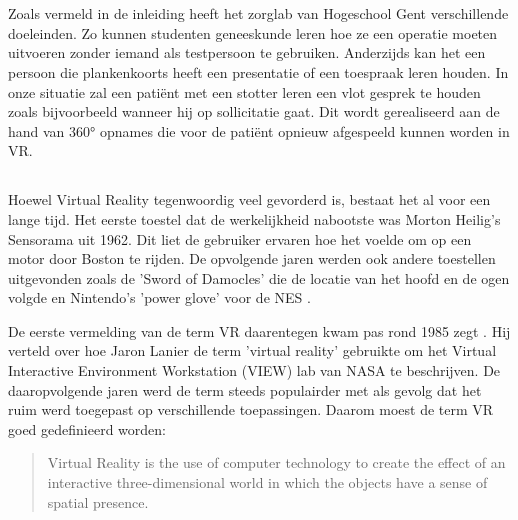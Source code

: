 \chapter{} \label{chap:State of the art}%
\label{ch:stand-van-zaken}



Zoals vermeld in de inleiding heeft het zorglab van Hogeschool Gent verschillende doeleinden. Zo kunnen studenten geneeskunde leren hoe ze een operatie moeten uitvoeren zonder iemand als testpersoon te gebruiken. Anderzijds kan het een persoon die plankenkoorts heeft een presentatie of een toespraak leren houden. In onze situatie zal een patiënt met een stotter leren een vlot gesprek te houden zoals bijvoorbeeld wanneer hij op sollicitatie gaat. Dit wordt gerealiseerd aan de hand van 360° opnames die voor de patiënt opnieuw afgespeeld kunnen worden in VR.

\section{}%
Hoewel Virtual Reality tegenwoordig veel gevorderd is, bestaat het al voor een lange tijd. Het eerste toestel dat de werkelijkheid nabootste was Morton Heilig’s Sensorama uit 1962. Dit liet de gebruiker ervaren hoe het voelde om op een motor door Boston te rijden. De opvolgende jaren werden ook andere toestellen uitgevonden zoals de 'Sword of Damocles' die de locatie van het hoofd en de ogen volgde en Nintendo's 'power glove' voor de NES \autocite{Boas2012}.

De eerste vermelding van de term VR daarentegen kwam pas rond 1985 zegt \textcite{Bryson2013}. Hij verteld over hoe Jaron Lanier de term 'virtual reality' gebruikte om het Virtual Interactive Environment Workstation (VIEW) lab van NASA te beschrijven. De daaropvolgende jaren werd de term steeds populairder met als gevolg dat het ruim werd toegepast op verschillende toepassingen. Daarom moest de term VR goed gedefinieerd worden:

\begin{quote}
    Virtual Reality is the use of computer technology to create the effect of an
    interactive three-dimensional world in which the objects have a sense of spatial
    presence. \autocite{Bryson2013}
\end{quote}

